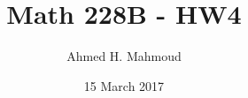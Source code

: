 \documentclass[12pt]{article}
\begin{document}
\title{Math 228B - HW4}
\author{Ahmed H. Mahmoud}
\date{15 March 2017} 

\maketitle

\newcommand{\cn}{Crank-Nicolson}
\newcommand{\lw}{Lax-Wendroff}


\newpage



%



\end{document}
